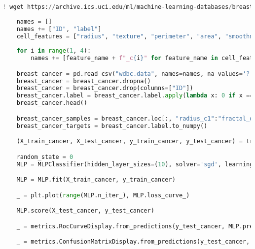 \documentclass[12pt, a4paper]{article}
\begin{document}
\begin{lstlisting}[language=Python, caption=Programma Completo]
    ! wget https://archive.ics.uci.edu/ml/machine-learning-databases/breast-cancer-wisconsin/wdbc.data
    
    names = []
    names += ["ID", "label"]
    cell_features = ["radius", "texture", "perimeter", "area", "smoothness", "compactness", "concavity", "concave_points", "symmetry", "fractal_dimension",]
    
    for i in range(1, 4):
        names += [feature_name + f"_c{i}" for feature_name in cell_features]

    breast_cancer = pd.read_csv("wdbc.data", names=names, na_values='?')
    breast_cancer = breast_cancer.dropna()
    breast_cancer = breast_cancer.drop(columns=["ID"])
    breast_cancer.label = breast_cancer.label.apply(lambda x: 0 if x == "B" else 1)
    breast_cancer.head()

    breast_cancer_samples = breast_cancer.loc[:, "radius_c1":"fractal_dimension_c3"].to_numpy()
    breast_cancer_targets = breast_cancer.label.to_numpy()

    (X_train_cancer, X_test_cancer, y_train_cancer, y_test_cancer) = train_test_split(breast_cancer_samples, breast_cancer_targets)

    random_state = 0
    MLP = MLPClassifier(hidden_layer_sizes=(10), solver='sgd', learning_rate_init=0.0001, max_iter=1000, random_state=random_state)

    MLP = MLP.fit(X_train_cancer, y_train_cancer)

    _ = plt.plot(range(MLP.n_iter_), MLP.loss_curve_)

    MLP.score(X_test_cancer, y_test_cancer)

    _ = metrics.RocCurveDisplay.from_predictions(y_test_cancer, MLP.predict_proba(X_test_cancer)[:, 1])

    _ = metrics.ConfusionMatrixDisplay.from_predictions(y_test_cancer, MLP.predict(X_test_cancer))
\end{lstlisting}
\end{document}
